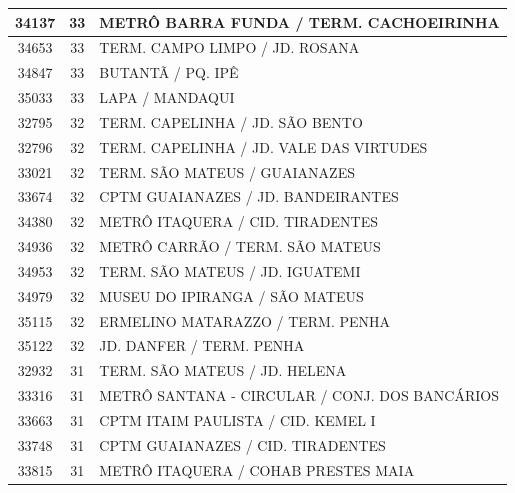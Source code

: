 \documentclass[
	12pt,				%
	oneside,			%
	a4paper,			%
	english,			%
	brazil				%
	]{abntex2ppgsi}
\begin{document}
{{\begin{apendicesenv}
\begin{longtable}{c|c|p{7cm}}
    34137 & 33    & METRÔ BARRA FUNDA / TERM. CACHOEIRINHA \\
\hline

    34653 & 33    & TERM. CAMPO LIMPO / JD. ROSANA \\
\hline

    34847 & 33    & BUTANTÃ / PQ. IPÊ \\
\hline

    35033 & 33    & LAPA / MANDAQUI \\
\hline

    32795 & 32    & TERM. CAPELINHA / JD. SÃO BENTO \\
\hline

    32796 & 32    & TERM. CAPELINHA / JD. VALE DAS VIRTUDES \\
\hline

    33021 & 32    & TERM. SÃO MATEUS / GUAIANAZES \\
\hline

    33674 & 32    & CPTM GUAIANAZES / JD. BANDEIRANTES \\
\hline

    34380 & 32    & METRÔ ITAQUERA / CID. TIRADENTES \\
\hline

    34936 & 32    & METRÔ CARRÃO / TERM. SÃO MATEUS \\
\hline

    34953 & 32    & TERM. SÃO MATEUS / JD. IGUATEMI \\
\hline

    34979 & 32    & MUSEU DO IPIRANGA / SÃO MATEUS \\
\hline

    35115 & 32    & ERMELINO MATARAZZO / TERM. PENHA \\
\hline

    35122 & 32    & JD. DANFER / TERM. PENHA     \\
\hline

    32932 & 31    & TERM. SÃO MATEUS / JD. HELENA \\
\hline

    33316 & 31    & METRÔ SANTANA - CIRCULAR / CONJ. DOS BANCÁRIOS \\
\hline

    33663 & 31    & CPTM ITAIM PAULISTA / CID. KEMEL I \\
\hline

    33748 & 31    & CPTM GUAIANAZES / CID. TIRADENTES \\
\hline

    33815 & 31    & METRÔ ITAQUERA / COHAB PRESTES MAIA \\
\hline


\end{longtable}
\end{apendicesenv}}}
\end{document}
